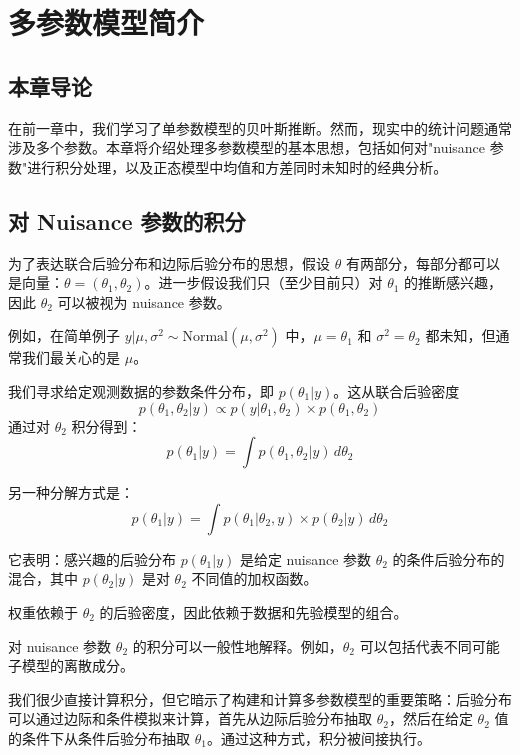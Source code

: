 
\chapter{多参数模型简介}

\section{本章导论}

在前一章中，我们学习了单参数模型的贝叶斯推断。然而，现实中的统计问题通常涉及多个参数。本章将介绍处理多参数模型的基本思想，包括如何对"nuisance 参数"进行积分处理，以及正态模型中均值和方差同时未知时的经典分析。

\section{对 Nuisance 参数的积分}

为了表达联合后验分布和边际后验分布的思想，假设 $\theta$ 有两部分，每部分都可以是向量：$\theta = (\theta_1, \theta_2)$。进一步假设我们只（至少目前只）对 $\theta_1$ 的推断感兴趣，因此 $\theta_2$ 可以被视为 nuisance 参数。

例如，在简单例子 $y|\mu, \sigma^2 \sim \text{Normal}(\mu, \sigma^2)$ 中，$\mu = \theta_1$ 和 $\sigma^2 = \theta_2$ 都未知，但通常我们最关心的是 $\mu$。

我们寻求给定观测数据的参数条件分布，即 $p(\theta_1|y)$。这从联合后验密度
\[
p(\theta_1, \theta_2|y) \propto p(y|\theta_1, \theta_2) \times p(\theta_1, \theta_2)
\]
通过对 $\theta_2$ 积分得到：
\[
p(\theta_1|y) = \int p(\theta_1, \theta_2|y) \, d\theta_2
\]

另一种分解方式是：
\[
p(\theta_1|y) = \int p(\theta_1|\theta_2, y) \times p(\theta_2|y) \, d\theta_2
\]

它表明：感兴趣的后验分布 $p(\theta_1|y)$ 是给定 nuisance 参数 $\theta_2$ 的条件后验分布的混合，其中 $p(\theta_2|y)$ 是对 $\theta_2$ 不同值的加权函数。

权重依赖于 $\theta_2$ 的后验密度，因此依赖于数据和先验模型的组合。

对 nuisance 参数 $\theta_2$ 的积分可以一般性地解释。例如，$\theta_2$ 可以包括代表不同可能子模型的离散成分。

\begin{Remark}
  我们很少直接计算积分，但它暗示了构建和计算多参数模型的重要策略：后验分布可以通过边际和条件模拟来计算，首先从边际后验分布抽取 $\theta_2$，然后在给定 $\theta_2$ 值的条件下从条件后验分布抽取 $\theta_1$。通过这种方式，积分被间接执行。
\end{Remark}

